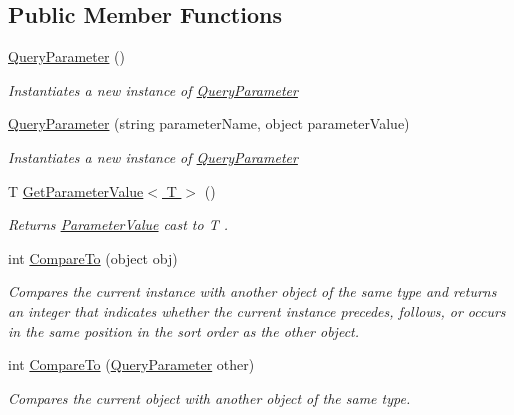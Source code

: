 \subsection*{Public Member Functions}
\begin{DoxyCompactItemize}
\item 
\hyperlink{classCqrs_1_1Repositories_1_1Queries_1_1QueryParameter_abf7919fe1130356255ba0b5c4b4f470a_abf7919fe1130356255ba0b5c4b4f470a}{Query\+Parameter} ()
\begin{DoxyCompactList}\small\item\em Instantiates a new instance of \hyperlink{classCqrs_1_1Repositories_1_1Queries_1_1QueryParameter}{Query\+Parameter} \end{DoxyCompactList}\item 
\hyperlink{classCqrs_1_1Repositories_1_1Queries_1_1QueryParameter_aada69debce3a88b09dfe7739ef22abb4_aada69debce3a88b09dfe7739ef22abb4}{Query\+Parameter} (string parameter\+Name, object parameter\+Value)
\begin{DoxyCompactList}\small\item\em Instantiates a new instance of \hyperlink{classCqrs_1_1Repositories_1_1Queries_1_1QueryParameter}{Query\+Parameter} \end{DoxyCompactList}\item 
T \hyperlink{classCqrs_1_1Repositories_1_1Queries_1_1QueryParameter_a14f2f14cba8d0807bb80d7b8d2c7e59a_a14f2f14cba8d0807bb80d7b8d2c7e59a}{Get\+Parameter\+Value$<$ T $>$} ()
\begin{DoxyCompactList}\small\item\em Returns \hyperlink{classCqrs_1_1Repositories_1_1Queries_1_1QueryParameter_a0d1c69ffc864aeda2eb515a9e57fbd7a_a0d1c69ffc864aeda2eb515a9e57fbd7a}{Parameter\+Value} cast to {\itshape T} . \end{DoxyCompactList}\item 
int \hyperlink{classCqrs_1_1Repositories_1_1Queries_1_1QueryParameter_a59a2bda12bc0161d0ceb95eb02062d08_a59a2bda12bc0161d0ceb95eb02062d08}{Compare\+To} (object obj)
\begin{DoxyCompactList}\small\item\em Compares the current instance with another object of the same type and returns an integer that indicates whether the current instance precedes, follows, or occurs in the same position in the sort order as the other object. \end{DoxyCompactList}\item 
int \hyperlink{classCqrs_1_1Repositories_1_1Queries_1_1QueryParameter_a48fa36fe6189bb03008b7f9fa3d30267_a48fa36fe6189bb03008b7f9fa3d30267}{Compare\+To} (\hyperlink{classCqrs_1_1Repositories_1_1Queries_1_1QueryParameter}{Query\+Parameter} other)
\begin{DoxyCompactList}\small\item\em Compares the current object with another object of the same type. \end{DoxyCompactList}\end{DoxyCompactItemize}
